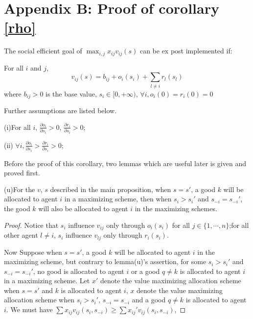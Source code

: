 
\chapter{Appendix B: Proof of corollary \ref{rho}} %

\label{Appendix_B} %
\begin{prop*}
  The social efficient goal of $\max_{i,j}x_{ij}v_{ij}(s)$ can be ex post implemented if:
  
For all $i$ and $j$,
$$v_{ij}(s)=b_{ij} + o_i(s_i) + \sum_{l \not = i} r_l(s_l) $$
where $b_{ij}>0$ is the base value, $s_i \in [0, + \infty)$, $\forall i,o_i(0)=r_i(0)=0$

Further assumptions are listed below.

(i)For all $i$, $\frac{\partial o_i}{\partial s_i} > 0$, $\frac{\partial r_i}{\partial s_i} > 0$;

(ii) $\forall i, \frac{\partial o_i}{\partial s_i}
> \frac{\partial r_i}{\partial s_i} > 0$;

\end{prop*}

Before the proof of this corollary,  two lemmas which are useful later is given and proved first.
\begin{lemma*}
  (u)For the $v$, $s$ described in the main proposition, when $s= s'$, a good $k$ will be allocated to agent $i$ in a maximizing scheme, then when $s_i > s_i'$ and $s_{-i}=s_{-i}'$, the good $k$ will also be allocated to agent $i$ in the maximizing schemes. 
\end{lemma*}
\begin{proof}
  Notice that $s_i$ influence $v_{ij}$ only through $o_i(s_i)$ for all $j \in \{1,\cdots,n\}$;for all other agent $l \not = i$, $s_i$ influence $v_{lj}$ only through $r_i(s_i)$.

  Now Suppose when $s= s'$, a good $k$ will be allocated to agent $i$ in the maximizing scheme, but contrary to lemma(u)'s assertion, for some $s_i > s_i'$ and $s_{-i}=s_{-i}'$,  no good is allocated to agent $i$ or a good $q \not= k$ is allocated to agent $i$ in a maximizing scheme. Let $x'$ denote the value maximizing allocation scheme when $s=s'$ and $k$ is allocated to agent $i$, $x$ denote the value maximizing allocation scheme when $s_i>s_i'$, $s_{-i}=s_{-i}$ and a good $q \not= k$ is allocated to agent $i$. We must have $\sum x_{ij}v_{ij}(s_i,s_{-i}) \geq \sum x_{ij}'v_{ij}(s_i,s_{-i})$,  
\end{proof}

